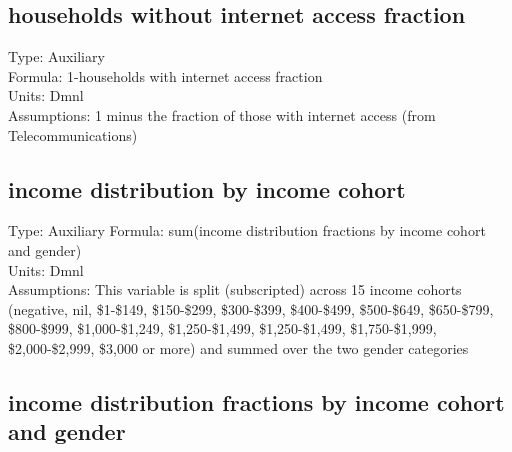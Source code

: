 \documentclass[
  11pt,
]{book}
\begin{document}
\hypertarget{households-without-internet-access-fraction}{%
\subsection{households without internet access fraction}\label{households-without-internet-access-fraction}}

Type: Auxiliary\\
Formula: 1-households with internet access fraction\\
Units: Dmnl\\
Assumptions: 1 minus the fraction of those with internet access (from Telecommunications)

\hypertarget{income-distribution-by-income-cohort}{%
\subsection{income distribution by income cohort}\label{income-distribution-by-income-cohort}}

Type: Auxiliary
Formula: sum(income distribution fractions by income cohort and gender)\\
Units: Dmnl\\
Assumptions: This variable is split (subscripted) across 15 income cohorts (negative, nil, \$1-\$149, \$150-\$299, \$300-\$399, \$400-\$499, \$500-\$649, \$650-\$799, \$800-\$999, \$1,000-\$1,249, \$1,250-\$1,499, \$1,250-\$1,499, \$1,750-\$1,999, \$2,000-\$2,999, \$3,000 or more) and summed over the two gender categories

\hypertarget{income-distribution-fractions-by-income-cohort-and-gender}{%
\subsection{income distribution fractions by income cohort and gender}\label{income-distribution-fractions-by-income-cohort-and-gender}}
\end{document}
